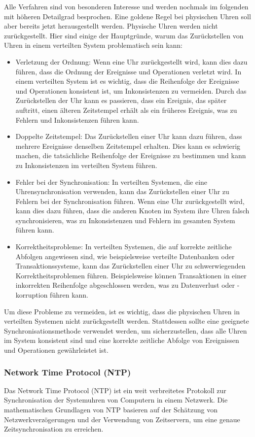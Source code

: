 Alle Verfahren sind von besonderen Interesse und werden nochmals im folgenden mit höheren Detailgrad besprochen. Eine goldene Regel bei physischen Uhren soll aber bereits jetzt herausgestellt werden. Physische Uhren werden nicht zurückgestellt. Hier sind einige der Hauptgründe, warum das Zurückstellen von Uhren in einem verteilten System problematisch sein kann:
\begin{itemize}
\item Verletzung der Ordnung: Wenn eine Uhr zurückgestellt wird, kann dies dazu führen, dass die Ordnung der Ereignisse und Operationen verletzt wird. In einem verteilten System ist es wichtig, dass die Reihenfolge der Ereignisse und Operationen konsistent ist, um Inkonsistenzen zu vermeiden. Durch das Zurückstellen der Uhr kann es passieren, dass ein Ereignis, das später auftritt, einen älteren Zeitstempel erhält als ein früheres Ereignis, was zu Fehlern und Inkonsistenzen führen kann.
\item Doppelte Zeitstempel: Das Zurückstellen einer Uhr kann dazu führen, dass mehrere Ereignisse denselben Zeitstempel erhalten. Dies kann es schwierig machen, die tatsächliche Reihenfolge der Ereignisse zu bestimmen und kann zu Inkonsistenzen im verteilten System führen.
\item Fehler bei der Synchronisation: In verteilten Systemen, die eine Uhrensynchronisation verwenden, kann das Zurückstellen einer Uhr zu Fehlern bei der Synchronisation führen. Wenn eine Uhr zurückgestellt wird, kann dies dazu führen, dass die anderen Knoten im System ihre Uhren falsch synchronisieren, was zu Inkonsistenzen und Fehlern im gesamten System führen kann.
\item Korrektheitsprobleme: In verteilten Systemen, die auf korrekte zeitliche Abfolgen angewiesen sind, wie beispielsweise verteilte Datenbanken oder Transaktionssysteme, kann das Zurückstellen einer Uhr zu schwerwiegenden Korrektheitsproblemen führen. Beispielsweise können Transaktionen in einer inkorrekten Reihenfolge abgeschlossen werden, was zu Datenverlust oder -korruption führen kann.
\end{itemize}
Um diese Probleme zu vermeiden, ist es wichtig, dass die physischen Uhren in verteilten Systemen nicht zurückgestellt werden. Stattdessen sollte eine geeignete Synchronisationsmethode verwendet werden, um sicherzustellen, dass alle Uhren im System konsistent sind und eine korrekte zeitliche Abfolge von Ereignissen und Operationen gewährleistet ist.

\subsubsection{Network Time Protocol (NTP)}
Das Network Time Protocol (NTP) ist ein weit verbreitetes Protokoll zur Synchronisation der Systemuhren von Computern in einem Netzwerk. Die mathematischen Grundlagen von NTP basieren auf der Schätzung von Netzwerkverzögerungen und der Verwendung von Zeitservern, um eine genaue Zeitsynchronisation zu erreichen.

